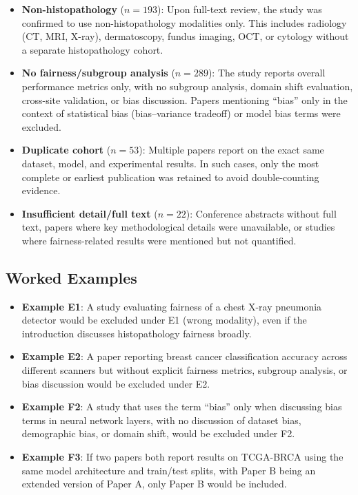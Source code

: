 \begin{itemize}
  \item[\textbf{F1}] \textbf{Non-histopathology} ($n=193$): Upon full-text review, the study was confirmed to use non-histopathology modalities only. This includes radiology (CT, MRI, X-ray), dermatoscopy, fundus imaging, OCT, or cytology without a separate histopathology cohort.
  
  \item[\textbf{F2}] \textbf{No fairness/subgroup analysis} ($n=289$): The study reports overall performance metrics only, with no subgroup analysis, domain shift evaluation, cross-site validation, or bias discussion. Papers mentioning ``bias'' only in the context of statistical bias (bias--variance tradeoff) or model bias terms were excluded.
  
  \item[\textbf{F3}] \textbf{Duplicate cohort} ($n=53$): Multiple papers report on the exact same dataset, model, and experimental results. In such cases, only the most complete or earliest publication was retained to avoid double-counting evidence.
  
  \item[\textbf{F4}] \textbf{Insufficient detail/full text} ($n=22$): Conference abstracts without full text, papers where key methodological details were unavailable, or studies where fairness-related results were mentioned but not quantified.
\end{itemize}

\subsection*{Worked Examples}

\begin{itemize}
  \item \textbf{Example E1}: A study evaluating fairness of a chest X-ray pneumonia detector would be excluded under E1 (wrong modality), even if the introduction discusses histopathology fairness broadly.
  
  \item \textbf{Example E2}: A paper reporting breast cancer classification accuracy across different scanners but without explicit fairness metrics, subgroup analysis, or bias discussion would be excluded under E2.
  
  \item \textbf{Example F2}: A study that uses the term ``bias'' only when discussing bias terms in neural network layers, with no discussion of dataset bias, demographic bias, or domain shift, would be excluded under F2.
  
  \item \textbf{Example F3}: If two papers both report results on TCGA-BRCA using the same model architecture and train/test splits, with Paper B being an extended version of Paper A, only Paper B would be included.
\end{itemize}

